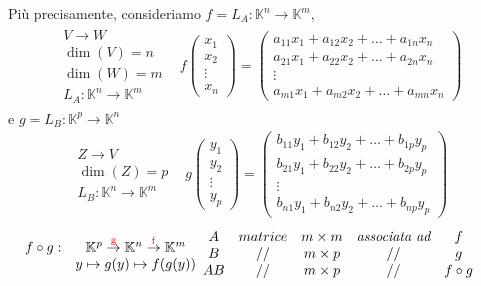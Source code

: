 \documentclass{book}
\begin{document}
Più precisamente, consideriamo $f=L_A:\mathbb{K}^n\to \mathbb{K}^m$,
\begin{eqnarray}
  \begin{matrix}
    V\to W\\
    \dim (V)=n\\
    \dim (W)=m\\
    L_A:\mathbb{K}^n\to \mathbb{K}^m
  \end{matrix} & f
                 \begin{pmatrix}
                   x_1\\
                   x_2\\
                   \vdots\\
                   x_n
                 \end{pmatrix} =
                 \begin{pmatrix}
                   a_{11}x_1+a_{12}x_2+\dots+a_{1n}x_n\\
                   a_{21}x_1+a_{22}x_2+\dots+a_{2n}x_n\\
                   \vdots\\
                   a_{m1}x_1+a_{m2}x_2+\dots+a_{mn}x_n
                 \end{pmatrix}
\end{eqnarray}
e $g=L_B:\mathbb{K}^p\to \mathbb{K}^n$
\begin{eqnarray}
  \begin{matrix}
    Z\to V\\
    \dim (Z)=p\\
    L_B:\mathbb{K}^n\to \mathbb{K}^m
  \end{matrix} & g
                 \begin{pmatrix}
                   y_1\\
                   y_2\\
                   \vdots\\
                   y_p
                 \end{pmatrix} =
                 \begin{pmatrix}
                   b_{11}y_1+b_{12}y_2+\dots+b_{1p}y_p\\
                   b_{21}y_1+b_{22}y_2+\dots+b_{2p}y_p\\
                   \vdots\\
                   b_{n1}y_1+b_{n2}y_2+\dots+b_{np}y_p
                 \end{pmatrix}
\end{eqnarray}
\begin{eqnarray*}
  \begin{matrix}
    f\circ g: & \mathbb{K}^p\stackrel{\mathrm{\color{red}g}}{\to}\mathbb{K}^n
                \stackrel{\mathrm{\color{red}f}}{\to}\mathbb{K}^m\\
    & y \mapsto g(y)\mapsto f(g(y))
  \end{matrix}
  &
    \begin{array}{cccccc}
      A & matrice & m\times m & \textit{associata ad} & f\\
      B& // & m\times p & // & g\\
      AB& // & m\times p& // &f\circ g
    \end{array}
\end{eqnarray*}
\end{document}

